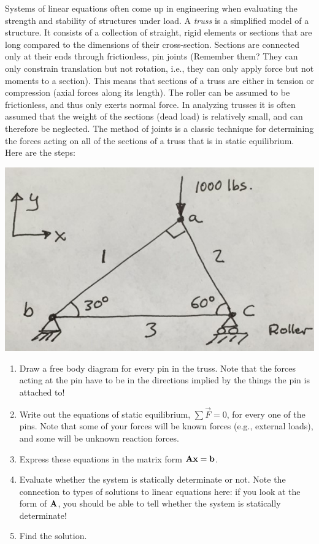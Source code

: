 \begin{prob}
Systems of linear equations often come up in engineering when evaluating the strength and stability of structures under load. A \textit{truss} is a simplified model of a structure. It consists of a collection of straight, rigid elements or sections that are long compared to the dimensions of their cross-section. Sections are connected only at their ends through frictionless, pin joints (Remember them? They can only constrain translation but not rotation, i.e., they can only apply force but not moments to a section). This means that sections of a truss are either in tension or compression (axial forces along its length). The roller can be assumed to be frictionless, and thus only exerts normal force. In analyzing trusses it is often assumed that the  weight of the sections (dead load) is relatively small, and can therefore be neglected. The method of joints is a classic technique for determining the forces acting on all of the sections of a truss that is in static equilibrium. Here are the steps:

\begin{center}
\includegraphics{FacesNight4/figs/triangle1.jpg}
\end{center}

\begin{enumerate}
\item Draw a free body diagram for every pin in the truss. Note that the forces acting at the pin have to be in the directions implied by the things the pin is attached to!
\item  Write out the equations of static equilibrium, $\sum \vec{F} = 0$, for every one of the pins.  Note that some of your forces will be known forces (e.g., external loads), and some will be unknown reaction forces.
\item Express these equations in the matrix form $\mathbf{A} \mathbf{x}  = \mathbf{b}$. 
\item Evaluate whether the system is statically determinate or not.  Note the connection to types of solutions to linear equations here: if you look at the form of $\mathbf{A}$, you should be able to tell whether the system is statically determinate!
\item Find the solution.
\end{enumerate}
\end{prob}
